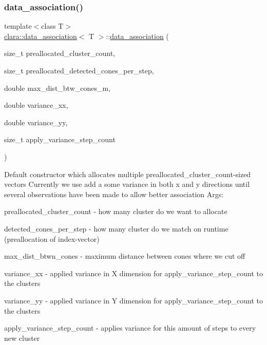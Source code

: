 \subsubsection{\texorpdfstring{data\+\_\+association()}{data\_association()}}
{\footnotesize\ttfamily template$<$class T$>$ \\
\hyperlink{classclara_1_1data__association}{clara\+::data\+\_\+association}$<$ T $>$\+::\hyperlink{classclara_1_1data__association}{data\+\_\+association} (\begin{DoxyParamCaption}\item[{size\+\_\+t}]{preallocated\+\_\+cluster\+\_\+count,  }\item[{size\+\_\+t}]{preallocated\+\_\+detected\+\_\+cones\+\_\+per\+\_\+step,  }\item[{double}]{max\+\_\+dist\+\_\+btw\+\_\+cones\+\_\+m,  }\item[{double}]{variance\+\_\+xx,  }\item[{double}]{variance\+\_\+yy,  }\item[{size\+\_\+t}]{apply\+\_\+variance\+\_\+step\+\_\+count }\end{DoxyParamCaption})\hspace{0.3cm}{\ttfamily [inline]}}



Default constructor which allocates multiple preallocated\+\_\+cluster\+\_\+count-\/sized vectors Currently we use add a some variance in both x and y directions until several observations have been made to allow better association Args\+: 


\begin{DoxyItemize}
\item preallocated\+\_\+cluster\+\_\+count -\/ how many cluster do we want to allocate
\item detected\+\_\+cones\+\_\+per\+\_\+step -\/ how many cluster do we match on runtime (preallocation of index-\/vector)
\item max\+\_\+dist\+\_\+btwn\+\_\+cones -\/ maximum distance between cones where we cut off
\item variance\+\_\+xx -\/ applied variance in X dimension for apply\+\_\+variance\+\_\+step\+\_\+count to the clusters
\item variance\+\_\+yy -\/ applied variance in Y dimension for apply\+\_\+variance\+\_\+step\+\_\+count to the clusters
\item apply\+\_\+variance\+\_\+step\+\_\+count -\/ applies variance for this amount of steps to every new cluster 
\end{DoxyItemize}


